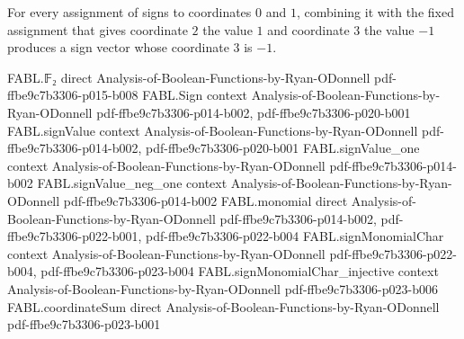 \begin{theorem}
\label{FABL.combineSignCube_example3_19_three}
\leanok
{}
For every assignment of signs to coordinates $0$ and $1$, combining it with the fixed
assignment that gives coordinate $2$ the value $1$ and coordinate $3$ the value $-1$
produces a sign vector whose coordinate $3$ is $-1$.
\end{theorem}

\begin{theorem}
\label{FABL.example3_19_restriction_eq_orFunction}
\leanok
{}
\proofstep
  {FABL.𝔽₂}
  {direct}
  {Analysis-of-Boolean-Functions-by-Ryan-ODonnell}
  {pdf-ffbe9c7b3306-p015-b008}
\proofstep
  {FABL.Sign}
  {context}
  {Analysis-of-Boolean-Functions-by-Ryan-ODonnell}
  {pdf-ffbe9c7b3306-p014-b002,
    pdf-ffbe9c7b3306-p020-b001}
\proofstep
  {FABL.signValue}
  {context}
  {Analysis-of-Boolean-Functions-by-Ryan-ODonnell}
  {pdf-ffbe9c7b3306-p014-b002,
    pdf-ffbe9c7b3306-p020-b001}
\proofstep
  {FABL.signValue_one}
  {context}
  {Analysis-of-Boolean-Functions-by-Ryan-ODonnell}
  {pdf-ffbe9c7b3306-p014-b002}
\proofstep
  {FABL.signValue_neg_one}
  {context}
  {Analysis-of-Boolean-Functions-by-Ryan-ODonnell}
  {pdf-ffbe9c7b3306-p014-b002}
\proofstep
  {FABL.monomial}
  {direct}
  {Analysis-of-Boolean-Functions-by-Ryan-ODonnell}
  {pdf-ffbe9c7b3306-p014-b002,
    pdf-ffbe9c7b3306-p022-b001,
    pdf-ffbe9c7b3306-p022-b004}
\proofstep
  {FABL.signMonomialChar}
  {context}
  {Analysis-of-Boolean-Functions-by-Ryan-ODonnell}
  {pdf-ffbe9c7b3306-p022-b004,
    pdf-ffbe9c7b3306-p023-b004}
\proofstep
  {FABL.signMonomialChar_injective}
  {context}
  {Analysis-of-Boolean-Functions-by-Ryan-ODonnell}
  {pdf-ffbe9c7b3306-p023-b006}
\proofstep
  {FABL.coordinateSum}
  {direct}
  {Analysis-of-Boolean-Functions-by-Ryan-ODonnell}
  {pdf-ffbe9c7b3306-p023-b001}
\proofstep

\end{theorem}
